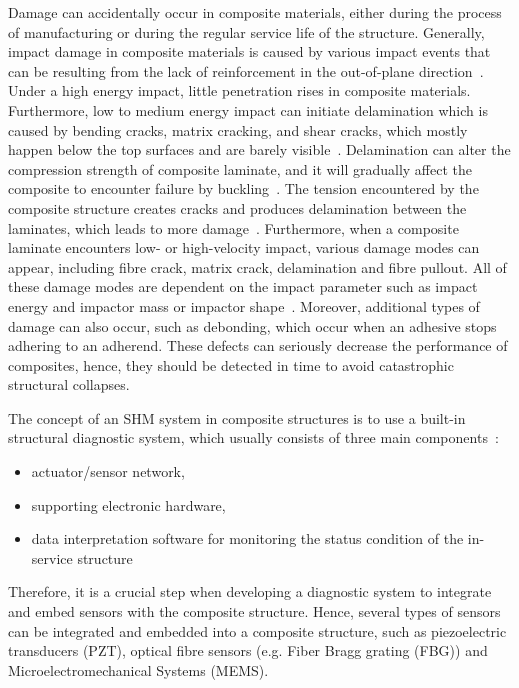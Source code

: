 Damage can accidentally occur in composite materials, either during the process of manufacturing or during the regular service life of the structure. 
Generally, impact damage in composite materials is caused by various impact events that can be resulting from the lack of reinforcement in the out-of-plane direction~\cite{Cai2012}. 
Under a high energy impact, little penetration rises in composite materials.  
Furthermore, low to medium energy impact can initiate delamination which is caused by bending cracks, matrix cracking, and shear cracks,  which mostly happen below the top surfaces and are barely visible~\cite{Cai2012}. 
Delamination can alter the compression strength of composite laminate, and it will gradually affect the composite to encounter failure by buckling~\cite{NurAzrieBtSafri2018}.
The tension encountered by the composite structure creates cracks and produces delamination between the laminates, which leads to more damage~\cite{NurAzrieBtSafri2018}. 
Furthermore, when a composite laminate encounters low- or high-velocity impact, various damage modes can appear, including fibre crack, matrix crack, delamination and fibre pullout. 
All of these damage modes are dependent on the impact parameter such as impact energy and impactor mass or impactor shape~\cite{NurAzrieBtSafri2018}.
Moreover, additional types of damage can also occur, such as debonding, which occur when an adhesive stops adhering to an adherend.
These defects can seriously decrease the performance of composites, hence, they should be detected in time to avoid catastrophic structural collapses.  

The concept of an SHM system in composite structures is to use a built-in structural diagnostic system, which usually consists of three main components~\cite{1}: 
\begin{itemize}
	\item actuator/sensor network,
	\item supporting electronic hardware,
	\item data interpretation software for monitoring the status condition of the in-service structure
\end{itemize}
Therefore, it is a crucial step when developing a diagnostic system to integrate and embed sensors with the composite structure. 
Hence, several types of sensors can be integrated and embedded into a composite structure, such as piezoelectric transducers (PZT), optical fibre sensors (e.g. Fiber Bragg grating (FBG)) and Microelectromechanical Systems (MEMS).

